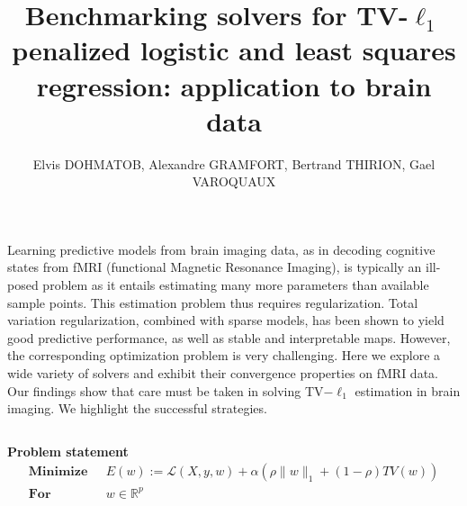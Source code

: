\documentclass[french]{STIC_poster}
\title{Benchmarking solvers for TV-$\ell_1$ penalized logistic and least squares regression: application to brain data}			%
\author{Elvis DOHMATOB, Alexandre GRAMFORT, Bertrand THIRION, Gael VAROQUAUX}		%
\begin{document}
	\begin{frame}[t]
            Learning predictive models from brain imaging data, as in decoding
            cognitive states from fMRI (functional Magnetic Resonance Imaging),
            is typically an ill-posed problem as it
            entails estimating many more parameters than available sample
            points. This estimation problem thus requires regularization. Total
            variation regularization, combined with sparse models, has been shown
            to yield good predictive performance, as well as stable and
            interpretable maps. However, the corresponding optimization problem is
            very challenging. %
            Here we explore a wide variety of solvers and exhibit
            their convergence properties on fMRI data. %
            Our findings show that care must be taken in solving
            TV$-\ell_1$ estimation in brain imaging. We highlight the successful strategies.
	    \begin{columns}[t]
	      \hfill
	      \begin{column}{.48\linewidth}
		\begin{abox}{\textbf{Problem statement}}
                                    \begin{equation}
                                      \left .
                                      \begin{split}
                                        \textbf{Minimize} & \text{ } E(w) := \mathcal{L}(X,y,w) + \alpha \left(\rho \|w\|_1 + \left(1-\rho\right)TV(w)\right)\\
                                        \textbf{For} & \text{ } w\in\mathbb{R}^p
                                        \label{eq:opt_pb}
                                      \end{split}

\end{equation}
\end{abox}
\end{column}
\end{columns}
\end{frame}
\end{document}
